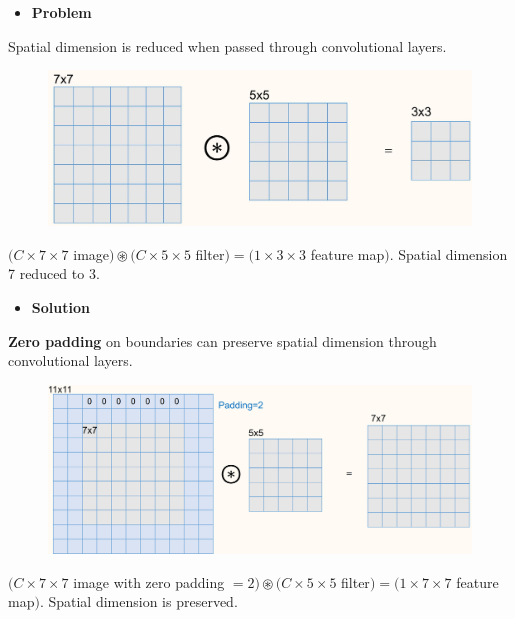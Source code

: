 \begin{concept}
    \begin{itemize}
        \item \textbf{Problem}
    \end{itemize}

    Spatial dimension is reduced when passed through convolutional layers.

    \begin{figure}[H]
        \centering
        \includegraphics[width=1.0\textwidth]{.././assets/5.3.jpg}
    \end{figure}

    $(C \times 7 \times 7$ image$) \circledast(C \times 5 \times 5$ filter$)=(1 \times 3 \times 3$ feature map$)$.
    Spatial dimension 7 reduced to 3.

    \par\noindent\textcolor{gray}{\hdashrule{\textwidth}{0.4pt}{1pt 2pt}}

    \begin{itemize}
        \item \textbf{Solution}
    \end{itemize}

    \textbf{Zero padding} on boundaries can preserve spatial dimension through convolutional layers.

    \begin{figure}[H]
        \centering
        \includegraphics[width=1.0\textwidth]{.././assets/5.4.png}
    \end{figure}

    $(C \times 7 \times 7$ image with zero padding $=2) \circledast(C \times 5 \times 5$ filter$)=(1 \times 7 \times 7$ feature map$)$.
    Spatial dimension is preserved.
\end{concept}

